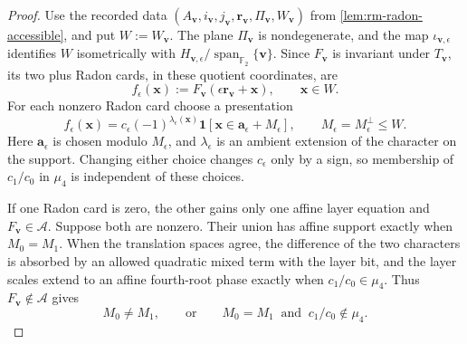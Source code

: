 \documentclass[11pt,letterpaper,onecolumn]{article}
\theoremstyle{plain}
\theoremstyle{definition}
\theoremstyle{remark}
\newcommand{\Ftwo}{\mathbb F_2}
\newcommand{\cA}{\mathscr A}
\newcommand{\Span}{\operatorname{span}}
\newcommand{\one}{\mathbf 1}
\begin{document}
\begin{proof}
Use the recorded data
\((A_{\mathbf{v}},i_{\mathbf{v}},j_{\mathbf{v}},{\mathbf{r}}_{\mathbf{v}},\Pi_{\mathbf{v}},W_{\mathbf{v}})\) from
\cref{lem:rm-radon-accessible}, and put \(W:=W_{\mathbf{v}}\).  The plane \(\Pi_{\mathbf{v}}\)
is nondegenerate, and the map \(\iota_{{\mathbf{v}},\epsilon}\) identifies \(W\)
isometrically with
\(H_{{\mathbf{v}},\epsilon}/\Span_{\Ftwo}\{{\mathbf{v}}\}\).  Since \(F_{\mathbf{v}}\) is
invariant under \(T_{\mathbf{v}}\), its two plus Radon cards, in these quotient coordinates, are
\[
 f_\epsilon({\mathbf{x}}):=F_{\mathbf{v}}(\epsilon {\mathbf{r}}_{\mathbf{v}}+{\mathbf{x}}),
 \qquad {\mathbf{x}}\in W.
\]
For each nonzero Radon card choose a presentation
\hypertarget{eq:v4-chart-presentation}{}
\begin{equation*}
 f_\epsilon({\mathbf{x}})
 =c_\epsilon(-1)^{\lambda_\epsilon({\mathbf{x}})}
  \one[{\mathbf{x}}\in {\mathbf{a}}_\epsilon+M_\epsilon],
 \qquad M_\epsilon=M_\epsilon^\perp\le W.
\end{equation*}
Here \({\mathbf{a}}_\epsilon\) is chosen modulo \(M_\epsilon\), and
\(\lambda_\epsilon\) is an ambient extension of the character on the
support.  Changing either choice changes \(c_\epsilon\) only by a sign, so
membership of \(c_1/c_0\) in \(\mu_4\) is independent of these choices.

If one Radon card is zero, the other gains only one affine layer equation and
\(F_{\mathbf{v}}\in\cA\).  Suppose both are nonzero.  Their union has affine support
exactly when \(M_0=M_1\).  When the translation spaces agree, the difference of
the two characters is absorbed by an allowed quadratic mixed term with the
layer bit, and the layer scales extend to an affine fourth-root phase
exactly when \(c_1/c_0\in\mu_4\).  Thus \(F_{\mathbf{v}}\notin\cA\) gives
\hypertarget{eq:v4-chart-obstruction}{}
\begin{equation*}
 M_0\ne M_1,
 \qquad\text{or}\qquad
 M_0=M_1\ \text{ and }\ c_1/c_0\notin\mu_4.
\end{equation*}


\end{proof}
\end{document}
